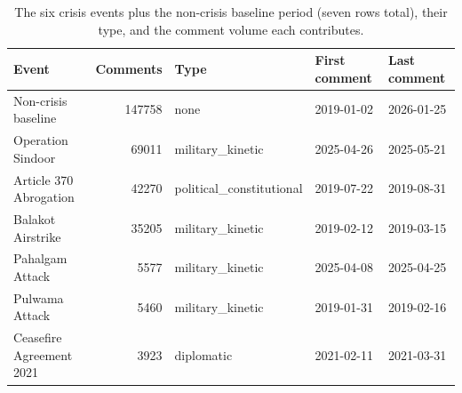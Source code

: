 

\begin{table}[h]
    \centering
    \caption{The six crisis events plus the non-crisis baseline period (seven rows total), their type, and the comment volume each contributes.}
    \label{tab:events}
    \begin{tabular}{lrlll}
    \toprule
    Event & Comments & Type & First comment & Last comment \\
    \midrule
    Non-crisis baseline & 147758 & none & 2019-01-02 & 2026-01-25 \\
    Operation Sindoor & 69011 & military\_kinetic & 2025-04-26 & 2025-05-21 \\
    Article 370 Abrogation & 42270 & political\_constitutional & 2019-07-22 & 2019-08-31 \\
    Balakot Airstrike & 35205 & military\_kinetic & 2019-02-12 & 2019-03-15 \\
    Pahalgam Attack & 5577 & military\_kinetic & 2025-04-08 & 2025-04-25 \\
    Pulwama Attack & 5460 & military\_kinetic & 2019-01-31 & 2019-02-16 \\
    Ceasefire Agreement 2021 & 3923 & diplomatic & 2021-02-11 & 2021-03-31 \\
    \bottomrule
    \end{tabular}
\end{table}